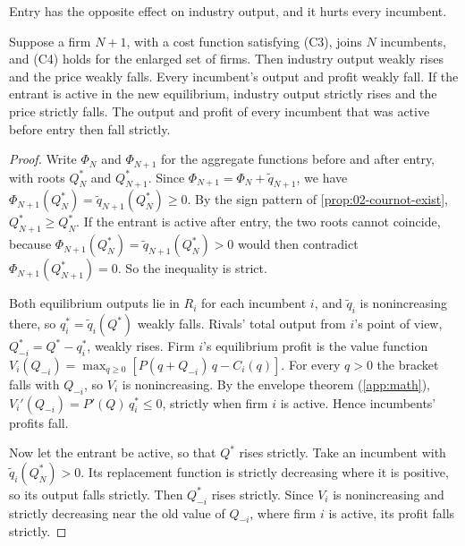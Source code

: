 Entry has the opposite effect on industry output, and it hurts every incumbent.

\begin{proposition}[Entry]\label{prop:02-entry-cs}
Suppose a firm $N + 1$, with a cost function satisfying (C3), joins $N$ incumbents, and (C4) holds for the enlarged
set of firms. Then industry output weakly rises and the price weakly falls. Every incumbent's output and profit
weakly fall. If the entrant is active in the new equilibrium, industry output strictly rises and the price strictly
falls. The output and profit of every incumbent that was active before entry then fall strictly.
\end{proposition}

\begin{proof}
Write $\Phi_N$ and $\Phi_{N+1}$ for the aggregate functions before and after entry, with roots $Q_N^*$ and
$Q_{N+1}^*$. Since $\Phi_{N+1} = \Phi_N + \tilde q_{N+1}$, we have $\Phi_{N+1}(Q_N^*) = \tilde q_{N+1}(Q_N^*) \ge
0$. By the sign pattern of \cref{prop:02-cournot-exist}, $Q_{N+1}^* \ge Q_N^*$. If the entrant is active after
entry, the two roots cannot coincide, because $\Phi_{N+1}(Q_N^*) = \tilde q_{N+1}(Q_N^*) > 0$ would then contradict
$\Phi_{N+1}(Q_{N+1}^*) = 0$. So the inequality is strict.

Both equilibrium outputs lie in $R_i$ for each incumbent $i$, and $\tilde q_i$ is nonincreasing there, so
$q_i^* = \tilde q_i(Q^*)$ weakly falls. Rivals' total output from $i$'s point of view, $Q_{-i}^* = Q^* - q_i^*$,
weakly rises. Firm $i$'s equilibrium profit is the value function $V_i(Q_{-i}) = \max_{q \ge 0}\left[P(q +
Q_{-i})\,q - C_i(q)\right]$. For every $q > 0$ the bracket falls with $Q_{-i}$, so $V_i$ is nonincreasing. By the
envelope theorem (\cref{app:math}), $V_i'(Q_{-i}) = P'(Q)\,q_i^* \le 0$, strictly when firm $i$ is active. Hence
incumbents' profits fall.

Now let the entrant be active, so that $Q^*$ rises strictly. Take an incumbent with $\tilde q_i(Q_N^*) > 0$. Its
replacement function is strictly decreasing where it is positive, so its output falls strictly. Then $Q_{-i}^*$
rises strictly. Since $V_i$ is nonincreasing and strictly decreasing near the old value of $Q_{-i}$, where firm $i$
is active, its profit falls strictly.
\end{proof}

